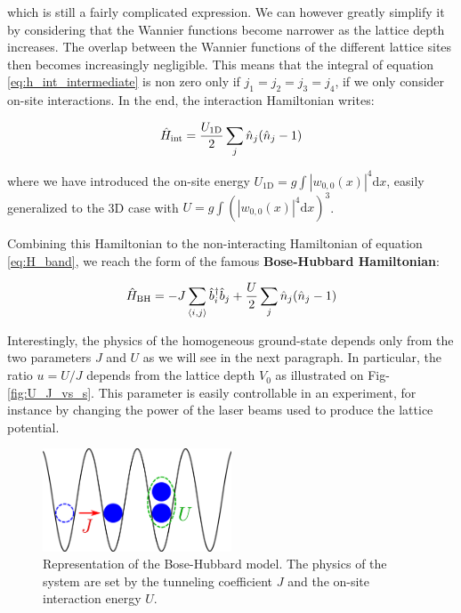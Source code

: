 \noindent which is still a fairly complicated expression. We can however greatly simplify it by considering that the Wannier functions become narrower as the lattice depth increases. The overlap between the Wannier functions of the different lattice sites then becomes increasingly negligible. This means that the integral of equation \ref{eq:h_int_intermediate} is non zero only if $j_1=j_2=j_3=j_4$, \ie if we only consider on-site interactions. In the end, the interaction Hamiltonian writes:

\begin{equation}
    \hat{H}_{\rm{int}}=\frac{U_{\mathrm{1D}}}{2} \sum_j \hat{n}_j (\hat{n}_j -1)
\end{equation}

\noindent where we have introduced the on-site energy $U_{\mathrm{1D}}=g \int\left|w_{0,0}(x)\right|^{4} \mathrm{d}x$, easily generalized to the 3D case with $U=g \int(\left|w_{0,0}(x)\right|^{4} \mathrm{d}x)^3$. 

Combining this Hamiltonian to the non-interacting Hamiltonian of equation \ref{eq:H_band}, we reach the form of the famous \textbf{Bose-Hubbard Hamiltonian}:

\begin{equation}
    \hat{H}_{\mathrm{BH}}= -J \sum_{\left\langle i,j\right\rangle} \hat{b}^{\dagger}_i \hat{b}_j + \frac{U}{2} \sum_j \hat{n}_j (\hat{n}_j -1)
\end{equation}

\noindent Interestingly, the physics of the homogeneous ground-state depends only from the two parameters $J$ and $U$ as we will see in the next paragraph. In particular, the ratio $u=U/J$ depends from the lattice depth $V_0$ as illustrated on Fig-\ref{fig:U_J_vs_s}. This parameter is easily controllable in an experiment, for instance by changing the power of the laser beams used to produce the lattice potential. 

\begin{figure}
    \centering
    \includegraphics[width=0.5\textwidth]{Fig/Chapter2/illu_bose_hubbard.png}
    \caption[Representation of the Bose-Hubbard model]{Representation of the Bose-Hubbard model. The physics of the system are set by the tunneling coefficient $J$ and the on-site interaction energy $U$.}
    \label{fig:my_label}
\end{figure}

